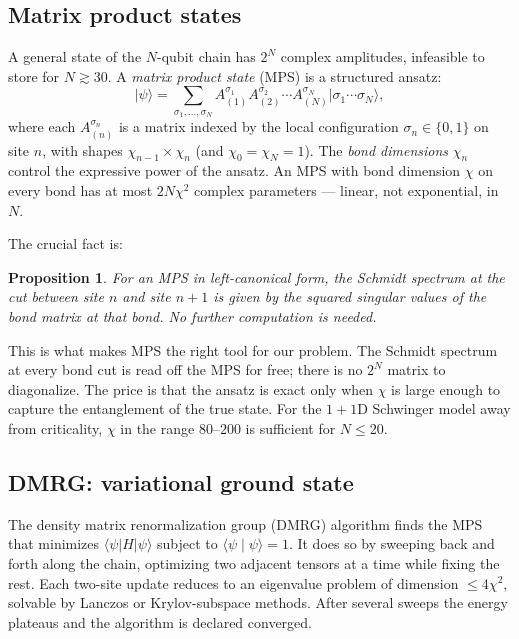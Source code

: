 \documentclass[11pt,a4paper]{article}
\theoremstyle{definition}
\theoremstyle{plain}
\newtheorem{proposition}[definition]{Proposition}
\theoremstyle{remark}
\newcommand{\ket}[1]{\lvert #1 \rangle}
\newcommand{\bra}[1]{\langle #1 \rvert}
\newcommand{\braket}[2]{\langle #1 \mid #2 \rangle}
\begin{document}
\subsection{Matrix product states}

A general state of the $N$-qubit chain has $2^N$ complex amplitudes,
infeasible to store for $N \gtrsim 30$.  A \emph{matrix product state}
(MPS) is a structured ansatz:
\begin{equation}\label{eq:mps}
  \ket{\psi} = \sum_{\sigma_1, \ldots, \sigma_N}
    A^{\sigma_1}_{(1)} A^{\sigma_2}_{(2)} \cdots A^{\sigma_N}_{(N)}
    \ket{\sigma_1 \cdots \sigma_N},
\end{equation}
where each $A^{\sigma_n}_{(n)}$ is a matrix indexed by the local
configuration $\sigma_n \in \{0, 1\}$ on site $n$, with shapes
$\chi_{n-1} \times \chi_n$ (and $\chi_0 = \chi_N = 1$).  The
\emph{bond dimensions} $\chi_n$ control the expressive power of the
ansatz.  An MPS with bond dimension $\chi$ on every bond has at most
$2 N \chi^2$ complex parameters --- linear, not exponential, in $N$.

The crucial fact is:

\begin{proposition}\label{prop:mps-schmidt}
For an MPS in left-canonical form, the Schmidt spectrum at the cut
between site $n$ and site $n+1$ is given by the squared singular
values of the bond matrix at that bond.  No further computation is
needed.
\end{proposition}

This is what makes MPS the right tool for our problem.  The Schmidt
spectrum at every bond cut is read off the MPS for free; there is no
$2^N$ matrix to diagonalize.  The price is that the ansatz is exact
only when $\chi$ is large enough to capture the entanglement of the
true state.  For the $1{+}1$D Schwinger model away from criticality,
$\chi$ in the range $80$--$200$ is sufficient for $N \le 20$.

\subsection{DMRG: variational ground state}

The density matrix renormalization group (DMRG) algorithm finds the
MPS that minimizes $\bra{\psi} H \ket{\psi}$ subject to
$\braket{\psi}{\psi} = 1$.  It does so by sweeping back and forth
along the chain, optimizing two adjacent tensors at a time while
fixing the rest.  Each two-site update reduces to an eigenvalue
problem of dimension $\le 4 \chi^2$, solvable by Lanczos or
Krylov-subspace methods.  After several sweeps the energy
plateaus and the algorithm is declared converged.
\end{document}
